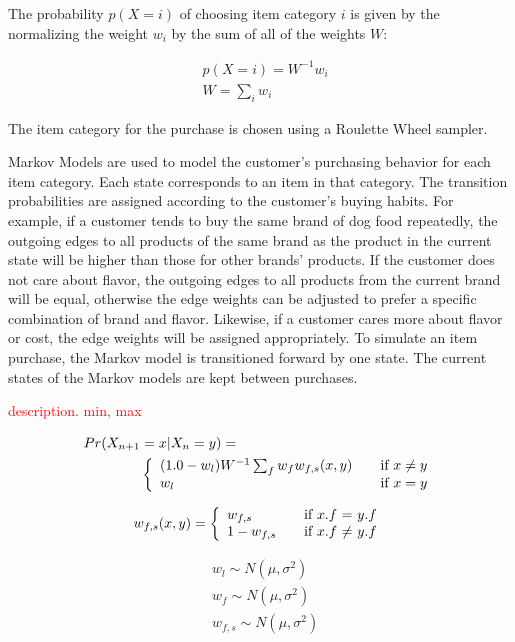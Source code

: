 \documentclass[conference]{IEEEtran}
\begin{document}
The probability $p(X=i)$ of choosing item category $i$ is given by the normalizing the weight $w_i$ by the sum of all of the weights $W$:

\begin{align}
&p(X=i) = W^{-1} w_i \\
&W = \sum_i w_i \nonumber
\end{align}

The item category for the purchase is chosen using a Roulette Wheel sampler.

Markov Models are used to model the customer's purchasing behavior for each item category.  Each state corresponds to an item in that category. The transition probabilities are assigned according to the customer's buying habits.  For example, if a customer tends to buy the same brand of dog food repeatedly, the outgoing edges to all products of the same brand as the product in the current state will be higher than those for other brands' products. If the customer does not care about flavor, the outgoing edges to all products from the current brand will be equal, otherwise the edge weights can be adjusted to prefer a specific combination of brand and flavor.  Likewise, if a customer cares more about flavor or cost, the edge weights will be assigned appropriately.  To simulate an item purchase, the Markov model is transitioned forward by one state.  The current states of the Markov models are kept between purchases.

\textcolor{red}{description. min, max}

\begin{align}
Pr(X_{n+1}&=x|X_n=y) = \\
& \left\{ 
  \begin{array}{l l}
   (1.0 - w_l) W^{-1} \sum_f w_f w_{f,s}(x, y)  & \quad \text{if $x \neq y$}\\
   w_l & \quad \text{if $x = y$}
  \end{array} \right.
\end{align}

\begin{equation}
w_{f,s}(x,y) = \left\{ 
  \begin{array}{l l}
   w_{f,s}  & \quad \text{if $x$.$f$ = $y$.$f$}\\
   1 - w_{f, s} & \quad \text{if $x$.$f$ $\neq$ $y$.$f$}
  \end{array} \right.
\end{equation} 

\begin{align}
&w_l \sim N(\mu, \sigma^2) \\
&w_f \sim N(\mu, \sigma^2) \\
&w_{f, s} \sim N(\mu, \sigma^2)
\end{align}
\end{document}
